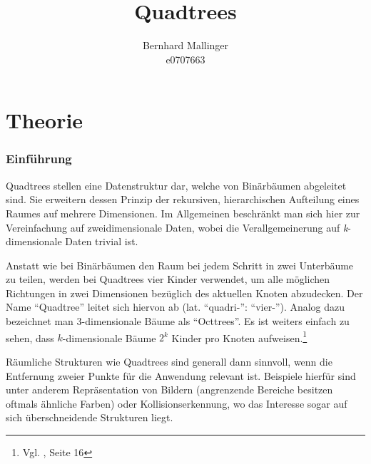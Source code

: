 \documentclass[%
			paper=a4,%
			DIV12,
			liststotoc,
			bibtotoc,
			draft=false,%
			titlepage
			]{scrartcl}
\title{Quadtrees}
\author{Bernhard Mallinger \\ e0707663}
\newcommand{\zit}[3]{#1 \cite{#2}, #3}
\newcommand{\footzit}[3]{\footnote{\zit{#1}{#2}{#3}}}
\begin{document}
\maketitle

\tableofcontents 

\newpage

%
%
%
%
%
%
%
%
%


\part{Theorie}
\section{Einführung}
Quadtrees stellen eine Datenstruktur dar, welche von Binärbäumen abgeleitet sind. Sie erweitern dessen Prinzip der rekursiven, hierarchischen Aufteilung eines Raumes auf mehrere Dimensionen. 
Im Allgemeinen beschränkt man sich hier zur Vereinfachung auf zweidimensionale Daten, wobei die Verallgemeinerung auf \textit{k}-dimensionale Daten trivial ist.

Anstatt wie bei Binärbäumen den Raum bei jedem Schritt in zwei Unterbäume zu teilen, werden bei Quadtrees vier Kinder verwendet, um alle möglichen Richtungen in zwei Dimensionen bezüglich des aktuellen Knoten abzudecken. Der Name "`Quadtree"' leitet sich hiervon ab (lat. "`quadri-"': "`vier-"'). 
Analog dazu bezeichnet man 3-dimensionale Bäume als "`Octtrees"'. Es ist weiters einfach zu sehen, dass $k$-dimensionale Bäume $2^k$ Kinder pro Knoten aufweisen.\footzit{Vgl.}{Bentley:1979}{Seite 16}

Räumliche Strukturen wie Quadtrees sind generall dann sinnvoll, wenn die Entfernung zweier Punkte für die Anwendung relevant ist. Beispiele hierfür sind unter anderem Repräsentation von Bildern (angrenzende Bereiche besitzen oftmals ähnliche Farben) oder Kollisionserkennung, wo das Interesse sogar auf sich überschneidende Strukturen liegt.
\end{document}
